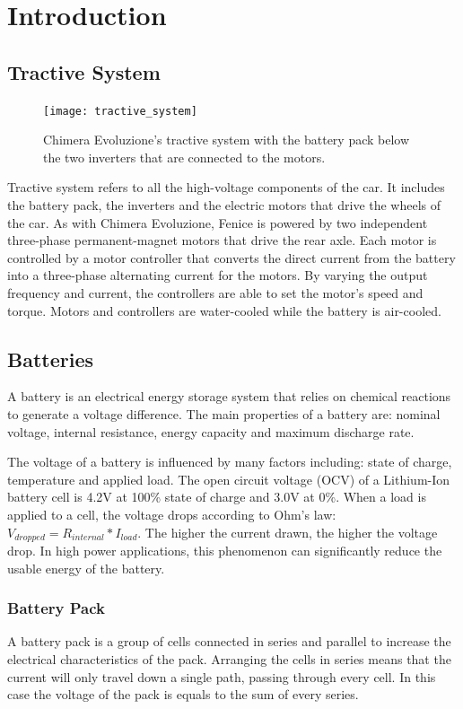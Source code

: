 \chapter{Introduction}

\section{Tractive System}
\begin{figure}[h]
    \centering
    \texttt{[image: tractive\_system]}
    \caption{Chimera Evoluzione's tractive system with the battery pack below the two inverters that are connected to the motors.}
    \label{fig:tractive_system}
\end{figure}
Tractive system refers to all the high-voltage components of the car. It includes the battery pack, the inverters and the electric motors that drive the wheels of the car.
As with Chimera Evoluzione, Fenice is powered by two independent three-phase permanent-magnet motors that drive the rear axle. Each motor is controlled by a motor controller that converts the direct current from the battery into a three-phase alternating current for the motors. By varying the output frequency and current, the controllers are able to set the motor's speed and torque. Motors and controllers are water-cooled while the battery is air-cooled.

\section{Batteries}
A battery is an electrical energy storage system that relies on chemical reactions to generate a voltage difference. The main properties of a battery are: nominal voltage, internal resistance, energy capacity and maximum discharge rate.

The voltage of a battery is influenced by many factors including: state of charge, temperature and applied load. The open circuit voltage (OCV) of a Lithium-Ion battery cell is 4.2V at 100\% state of charge and 3.0V at 0\%.
When a load is applied to a cell, the voltage drops according to Ohm's law: $V_{dropped} = R_{internal}*I_{load}$. The higher the current drawn, the higher the voltage drop. In high power applications, this phenomenon can significantly reduce the usable energy of the battery.

\subsection{Battery Pack}
A battery pack is a group of cells connected in series and parallel to increase the electrical characteristics of the pack. Arranging the cells in series means that the current will only travel down a single path, passing through every cell. In this case the voltage of the pack is equals to the sum of every series.

